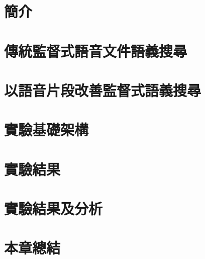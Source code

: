 \section{簡介}

\section{傳統監督式語音文件語義搜尋}

\section{以語音片段改善監督式語義搜尋}

\section{實驗基礎架構}

\section{實驗結果}

\section{實驗結果及分析}

\section{本章總結}
